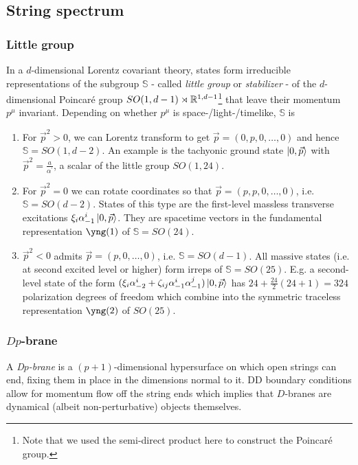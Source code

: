 \subsection{String spectrum}
\subsubsection{Little group}
In a $d$-dimensional Lorentz covariant theory, states form irreducible representations of the subgroup $\mathbb{S}$ - called \emph{little group} or \emph{stabilizer} - of the $d$-dimensional Poincaré group $SO(1,d-1)\rtimes \mathbb{R}^{1,d-1}$\footnote{Note that we used the semi-direct product here to construct the Poincaré group.} that leave their momentum $p^\mu$ invariant. Depending on whether $p^\mu$ is space-/light-/timelike, $\mathbb{S}$ is 
\begin{enumerate}
	\item For $\vec{p}^2>0$, we can Lorentz transform to get $\vec{p}=(0,p,0,\dots,0)$ and hence $\mathbb{S}=SO(1,d-2)$. An example is the tachyonic ground state $\ket{0,\vec{p}}$ with $\vec{p}^2= \frac{a}{\alpha^\prime}$, a scalar of the little group $SO(1,24)$.
	\item For $\vec{p}^2=0$ we can rotate coordinates so that $\vec{p}=(p,p,0,\dots,0)$, i.e. $\mathbb{S}=SO(d-2)$. States of this type are the first-level massless transverse excitations $\xi_i \alpha^i_{-1}\ket{0,\vec{p}}$. They are spacetime vectors in the fundamental representation $\yng(1)$ of $\mathbb{S}=SO(24)$.
	\item $\vec{p}^2<0$ admits $\vec{p}=(p,0,\dots,0)$, i.e. $\mathbb{S}=SO(d-1)$. All massive states (i.e. at second excited level or higher) form irreps of $\mathbb{S}=SO(25)$. E.g. a second-level state of the form $(\xi_i \alpha^i_{-2}+\zeta_{ij} \alpha^i_{-1} \alpha^j_{-1})\ket{0,\vec{p}}$ has $24+\frac{24}{2}(24+1)=324$ polarization degrees of freedom which combine into the symmetric traceless representation $\yng(2)$ of $SO(25)$.
\end{enumerate}
\subsubsection{$Dp$-brane}
A \emph{D$p$-brane} is a $(p+1)$-dimensional hypersurface on which open strings can end, fixing them in place in the dimensions normal to it. DD boundary conditions allow for momentum flow off the string ends which implies that $D$-branes are dynamical (albeit non-perturbative) objects themselves.
